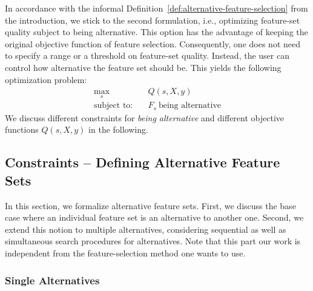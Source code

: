 \documentclass{article}
\theoremstyle{definition}
\begin{document}
In accordance with the informal Definition~\ref{def:alternative-feature-selection} from the introduction, we stick to the second formulation, i.e., optimizing feature-set quality subject to being alternative.
This option has the advantage of keeping the original objective function of feature selection.
Consequently, one does not need to specify a range or a threshold on feature-set quality.
Instead, the user can control how alternative the feature set should be.
This yields the following optimization problem:
%
\begin{align}
	\max_s &\quad Q(s,X,y) \nonumber \\
	\text{subject to:} &\quad F_s~\text{being alternative}
	\label{eq:afs}
\end{align}
%
We discuss different constraints for \emph{being alternative} and different objective functions $Q(s,X,y)$ in the following.

\subsection{Constraints -- Defining Alternative Feature Sets}
\label{sec:approach:constraints}

In this section, we formalize alternative feature sets.
First, we discuss the base case where an individual feature set is an alternative to another one.
Second, we extend this notion to multiple alternatives, considering sequential as well as simultaneous search procedures for alternatives.
Note that this part our work is independent from the feature-selection method one wants to use.

\subsubsection{Single Alternatives}
\label{sec:approach:constraints:single}
\end{document}
